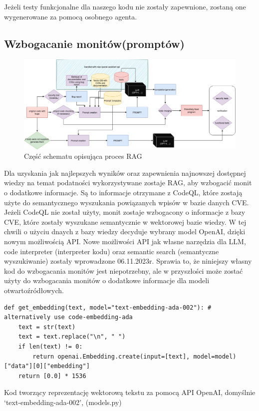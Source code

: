 Jeżeli testy funkcjonalne dla naszego kodu nie zostały zapewnione, zostaną one wygenerowane za pomocą osobnego agenta.

\subsection{Wzbogacanie monitów(promptów)}
\begin{figure}[h]
    \centering
    \includegraphics[clip, trim=3cm 11cm 3cm 0cm, width=0.9\linewidth]{img/gptester.drawio.png}
    \caption{Część schematu opisująca proces RAG}
    \label{fig:przyciety_obraz}
\end{figure}

Dla uzyskania jak najlepszych wyników oraz zapewnienia najnowszej dostępnej wiedzy na temat podatności wykorzystywane zostaje RAG, aby wzbogacić monit o dodatkowe informacje. Są to informacje otrzymane z CodeQL, które zostają użyte do semantycznego wyszukania powiązanych wpisów w bazie danych CVE. 
Jeżeli CodeQL nie został użyty, monit zostaje wzbogacony o informacje z bazy CVE, które zostały wyszukane semantycznie w wektorowej bazie wiedzy. W tej chwili o użyciu dnaych z bazy wiedzy decyduje wybrany model OpenAI, dzięki nowym możliwością API. 
Nowe możliwości API jak własne narzędzia dla LLM, code interpreter (interpreter kodu) oraz semantic search (semantyczne wyszukiwanie) zostały wprowadzone 06.11.2023r.
Sprawia to, że niniejszy własny kod do wzbogacania monitów jest niepotrzebny, ale w przyszłości może zostać użyty do wzbogacania monitów o dodatkowe informacje dla modeli otwartoźródłowych. 
\begin{listing}
    \begin{verbatim}  
def get_embedding(text, model="text-embedding-ada-002"): # alternatively use code-embedding-ada
    text = str(text)
    text = text.replace("\n", " ")
    if len(text) != 0:
        return openai.Embedding.create(input=[text], model=model)["data"][0]["embedding"]
    return [0.0] * 1536

    \end{verbatim}
    \caption{Kod tworzący reprezentację wektorową tekstu za pomocą API OpenAI, domyślnie `text-embedding-ada-002', (models.py)} 
    \label{listing:vector_embedding}
\end{listing}
    
